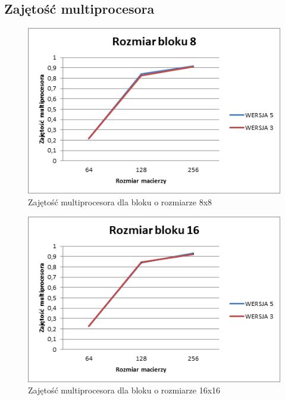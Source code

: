 \documentclass{article}
\begin{document}
\subsection{Zajętość multiprocesora}

\begin{figure}[H]
	\centering
	\includegraphics[width=\linewidth]{./images/graphs/zajetosc/graph1.png}
	\caption{Zajętość multiprocesora dla bloku o rozmiarze 8x8}
	\label{fig:graphz1}
\end{figure}

\begin{figure}[H]
	\centering
	\includegraphics[width=\linewidth]{./images/graphs/zajetosc/graph2.png}
	\caption{Zajętość multiprocesora dla bloku o rozmiarze 16x16}
	\label{fig:graphz2}
\end{figure}
\end{document}
